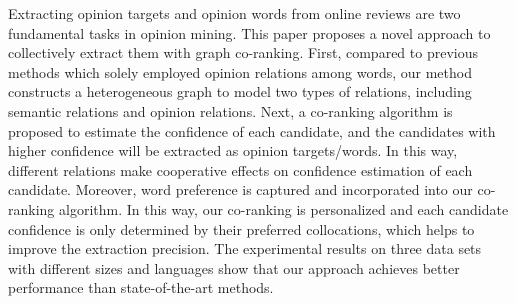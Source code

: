 Extracting opinion targets and opinion words from online reviews are two fundamental tasks in opinion mining. This paper proposes a novel approach to collectively extract them with graph co-ranking. First, compared to previous methods which solely employed opinion relations among words, our method constructs a heterogeneous graph to model two types of relations, including semantic relations and opinion relations. Next, a co-ranking algorithm is proposed to estimate the confidence of each candidate, and the candidates with higher confidence will be extracted as opinion targets/words. In this way, different relations make cooperative effects on confidence estimation of each candidate. Moreover, word preference is captured and incorporated into our co-ranking algorithm. In this way, our co-ranking is personalized and each candidate confidence is only determined by their preferred collocations, which helps to improve the extraction precision. The experimental results on three data sets with different sizes and languages show that our approach achieves better performance than state-of-the-art methods.
